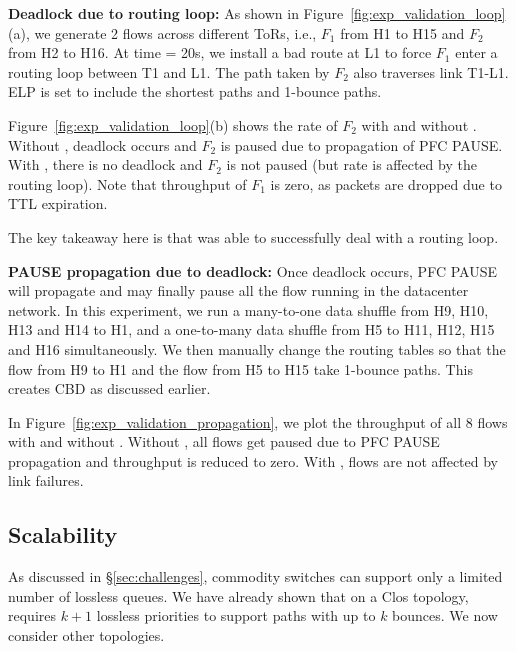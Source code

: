 \textbf{Deadlock due to routing loop:} As shown in
Figure~\ref{fig:exp_validation_loop}(a), we generate 2 flows across different
ToRs, i.e.,  $F_1$ from H1 to H15 and $F_2$ from H2 to H16. At time = 20s, we
install a bad route at L1 to force $F_1$ enter a routing loop between T1 and L1.
The path taken by $F_2$ also traverses link T1-L1.  ELP is set to include the
shortest paths and 1-bounce paths.

Figure~\ref{fig:exp_validation_loop}(b) shows the rate of $F_2$ with and
without \sysname{}. Without \sysname{}, deadlock occurs
and $F_2$ is paused due to propagation of PFC PAUSE. With \sysname{}, there is
no deadlock and $F_2$ is not paused (but rate is affected by the routing loop). Note that
throughput of $F_1$ is zero, as packets are dropped due to TTL expiration.

The key takeaway here is that \sysname{} was able to successfully deal with a
routing loop.

\textbf{PAUSE propagation due to deadlock:} Once deadlock occurs, PFC PAUSE will
propagate and may finally pause all the flow running in the datacenter network.
In this experiment, we run a many-to-one data shuffle from H9, H10, H13 and H14
to H1, and a one-to-many data shuffle from H5 to  H11, H12, H15 and H16
simultaneously. We then manually change the routing tables so that the flow from H9
to H1 and the flow from H5 to H15 take 1-bounce paths. This creates CBD as
discussed earlier.

In Figure~\ref{fig:exp_validation_propagation}, we plot the throughput of all 8
flows with and without \sysname{}. Without \sysname{}, all flows get paused due
to PFC PAUSE propagation and throughput is reduced to zero. With \sysname{},
flows are not affected by link failures.

\subsection{Scalability}
\label{subsec:exp_overhead}

As discussed in \S\ref{sec:challenges}, commodity switches can support only a
limited number of lossless queues.  We have already shown that on a Clos
topology, \sysname{} requires $k+1$ lossless priorities to support paths with
up to $k$ bounces. We now consider other topologies.

